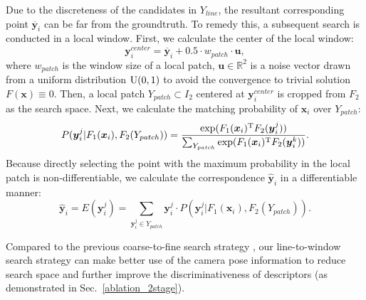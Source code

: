 \documentclass[10pt,twocolumn,letterpaper]{article}
\begin{document}
Due to the discreteness of the candidates in $Y_{line}$, the resultant corresponding point $\overline{\boldsymbol{y}}_i$ can be far from the groundtruth. To remedy this, a subsequent search is conducted in a local window. First, we calculate the center of the local window:
\begin{equation}
\label{eq_l2w}
     \boldsymbol{y}_i^{center} = \overline{\boldsymbol{y}}_i+0.5\cdot w_{patch}\cdot  \boldsymbol{u},
\end{equation}
where $w_{patch}$ is the window size of a local patch, $ \boldsymbol{u}\in\mathbb{R}^2$ is a noise vector drawn from a uniform distribution ${\rm U}(0,1)$ to avoid the convergence to trivial solution $F( \boldsymbol{x})\equiv{0}$.
Then, a local patch $Y_{patch}\subset I_2$ centered at $\boldsymbol{y}_i^{center}$ is cropped from $F_2$ as the search space. Next, we calculate the matching probability of $\boldsymbol{x}_i$ over $Y_{patch}$:
\begin{equation}
\label{eq_probfunc_patch}
    P({\boldsymbol{y}_i^j}|F_1({\boldsymbol{x}_i}),F_2(Y_{patch}))=\frac{\exp (F_1({\boldsymbol{x}_i})^{\rm T}F_2({\boldsymbol{y}_i^j}))}{\sum_{Y_{patch}}\exp (F_1({\boldsymbol{x}_i})^{\rm T}F_2({\boldsymbol{y}_i^k}))}.
\end{equation} 
Because directly selecting the point with the maximum probability in the local patch is non-differentiable, we calculate the correspondence $\hat{\boldsymbol{y}}_i$ in a differentiable manner:
\begin{equation}
\label{eq_dmfunc_patch}
    \hat{\boldsymbol{y}}_i=E({\boldsymbol{y}_i^j})=\sum_{{\boldsymbol{y}_i^j}\in Y_{patch}}{\boldsymbol{y}_i^j}\cdot P({\boldsymbol{y}_i^j}|F_1({\boldsymbol{x}_i}),F_2(Y_{patch})).
\end{equation}


Compared to the previous coarse-to-fine search strategy \cite{wangLearningFeatureDescriptors2020}, our line-to-window search strategy can make better use of the camera pose information to reduce search space and further improve the discriminativeness of descriptors (as demonstrated in Sec.~\ref{ablation_2stage}). 
\end{document}
